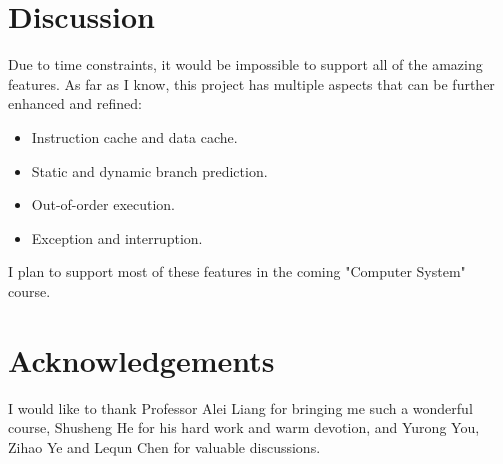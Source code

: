\documentclass{article}
\begin{document}
%
%

\section{Discussion}
Due to time constraints, it would be impossible to support all of the amazing features. As far as I know, this project has multiple aspects that can be further enhanced and refined:
\begin{itemize}
\item
Instruction cache and data cache.
\item
Static and dynamic branch prediction.
\item
Out-of-order execution.
\item
Exception and interruption.
\end{itemize}
I plan to support most of these features in the coming "Computer System" course.

\section{Acknowledgements}
I would like to thank Professor Alei Liang for bringing me such a wonderful course, Shusheng He for his hard work and warm devotion, and Yurong You, Zihao Ye and Lequn Chen for valuable discussions.

\newpage
\nocite{patterson2013computer, hennessy2011computer, li2011computer, palnitkar2003verilog, lei2014computer}



\end{document}
